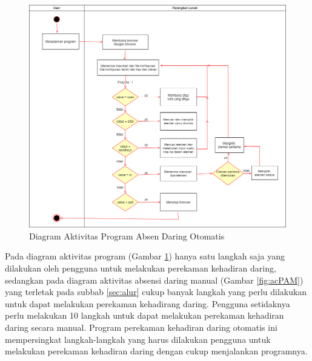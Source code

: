 \begin{figure}[H]
	\centering
	\includegraphics[scale=0.45]{Gambar/ActivityAplikasi.png}
	\caption{Diagram Aktivitas Program Absen Daring Otomatis} 
	\label{fig:ActivityAplikasi}
\end{figure}
\vspace{-0.3cm}
Pada diagram aktivitas program (Gambar \ref{fig:ActivityAplikasi}) hanya satu langkah saja yang dilakukan oleh pengguna untuk melakukan perekaman kehadiran daring, sedangkan pada diagram aktivitas absensi daring manual (Gambar \ref{fig:acPAM}) yang terletak pada subbab \ref{sec:alur} cukup banyak langkah yang perlu dilakukan untuk dapat melakukan perekaman kehadirang daring. Pengguna setidaknya perlu melakukan 10 langkah untuk dapat melakukan perekaman kehadiran daring secara manual. Program perekaman kehadiran daring otomatis ini mempersingkat langkah-langkah yang harus dilakukan pengguna untuk melakukan perekaman kehadiran daring dengan cukup menjalankan programnya.

